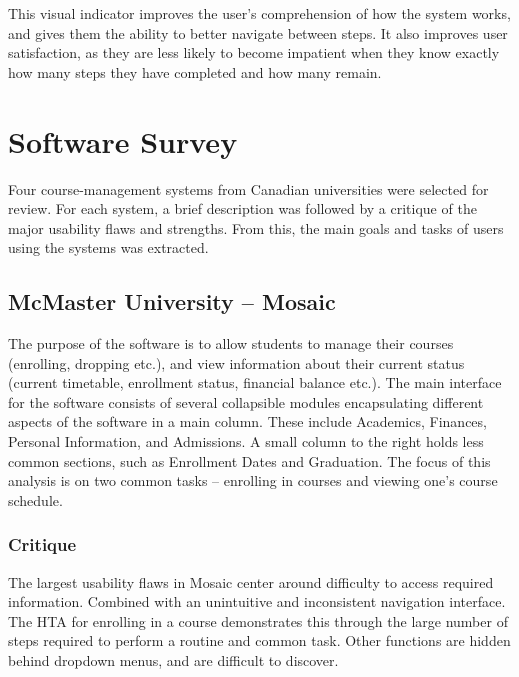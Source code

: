 \documentclass[10pt]{article}
\newenvironment{InlineColumnFigure}
{\par\medskip\noindent\minipage{\linewidth}}
{\endminipage\par\medskip}
\newcommand{\Caption}[1]
{\vspace{-4mm}\fontsize{9}{9}\textbf{Figure \refstepcounter{figCounter} 
\arabic{figCounter}: #1}}
\newcounter{figCounter}
\begin{document}
\begin{multicols}{2}
This visual indicator improves the user's comprehension of how the system 
works, and gives them the ability to better navigate between steps. It also improves user satisfaction, 
as they are less likely to become impatient when they know exactly 
how many steps they have completed and how many remain. 

\section*{Software Survey}
Four course-management systems from Canadian universities were selected for 
review. For each system, a brief description was followed by a critique of 
the major usability flaws and strengths. From this, the main goals and tasks of 
users using the systems was extracted. 


\subsection*{McMaster University -- Mosaic}
The purpose of the software is to allow students to manage their courses 
(enrolling, dropping etc.), and view information about their current status 
(current timetable, enrollment status, financial balance etc.). The main 
interface for the software consists of several collapsible modules 
encapsulating different aspects of the software in a main column. These include 
Academics, Finances, Personal Information, and Admissions. A small column to 
the right holds less common sections, such as Enrollment Dates and Graduation. 
The focus of this analysis is on two common tasks -- enrolling in courses and 
viewing one's course schedule.


\subsubsection*{Critique}
The largest usability flaws in Mosaic center around difficulty to access 
required information. Combined with an unintuitive and inconsistent navigation 
interface. The HTA for enrolling in a course demonstrates this 
through the large number of steps required to perform a routine and common task. 
Other functions are hidden behind dropdown menus, and are difficult to discover.\\


\end{multicols}
\end{document}
